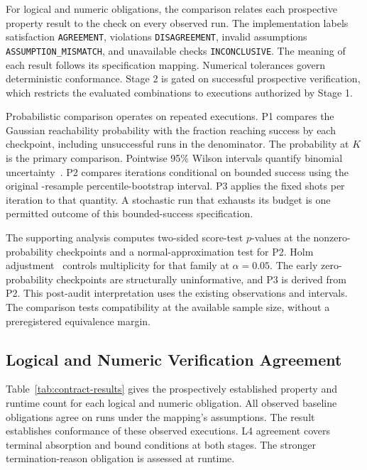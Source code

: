 \documentclass[conference]{IEEEtran}
\begin{document}
For logical and numeric obligations, the comparison relates each prospective property result to the check on every observed run. The implementation labels satisfaction \texttt{AGREEMENT}, violations \texttt{DISAGREEMENT}, invalid assumptions \texttt{ASSUMPTION\_MISMATCH}, and unavailable checks \texttt{INCONCLUSIVE}. The meaning of each result follows its specification mapping. Numerical tolerances govern deterministic conformance. Stage 2 is gated on successful prospective verification, which restricts the evaluated combinations to executions authorized by Stage 1.

Probabilistic comparison operates on repeated executions. P1 compares the Gaussian reachability probability with the fraction reaching success by each checkpoint, including unsuccessful runs in the denominator. The probability at $K$ is the primary comparison. Pointwise 95\% Wilson intervals quantify binomial uncertainty~\cite{wilson}. P2 compares iterations conditional on bounded success using the original \BootstrapSamples-resample percentile-bootstrap interval. P3 applies the fixed shots per iteration to that quantity. A stochastic run that exhausts its budget is one permitted outcome of this bounded-success specification.

The supporting analysis computes two-sided score-test $p$-values at the nonzero-probability checkpoints and a normal-approximation test for P2. Holm adjustment~\cite{holm} controls multiplicity for that family at $\alpha=0.05$. The early zero-probability checkpoints are structurally uninformative, and P3 is derived from P2. This post-audit interpretation uses the existing observations and intervals. The comparison tests compatibility at the available sample size, without a preregistered equivalence margin.

\subsection{Logical and Numeric Verification Agreement}
Table~\ref{tab:contract-results} gives the prospectively established property and runtime count for each logical and numeric obligation. All observed baseline obligations agree on \BaselineRuns runs under the mapping's assumptions. The result establishes conformance of these observed executions. L4 agreement covers terminal absorption and bound conditions at both stages. The stronger termination-reason obligation is assessed at runtime.
\end{document}
